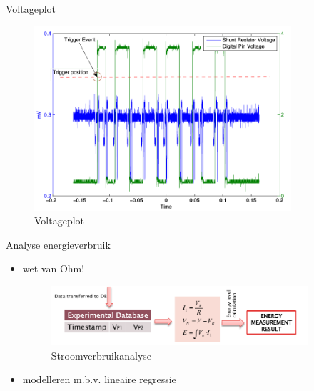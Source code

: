 \documentclass[presentation, bigger]{beamer}
\begin{document}
\begin{frame}[label=sec-3-4]{Voltageplot}
  \begin{figure}
    \centering
    \includegraphics[width=0.85\textwidth,keepaspectration=true]{elek/energy_measurement_plot.png}
    \caption{Voltageplot}
  \end{figure}
\end{frame}

\begin{frame}[label=sec-3-5]{Analyse energieverbruik}
  \begin{itemize}
  \item wet van Ohm!
    \begin{figure}
      \centering
      \includegraphics[width=0.9\textwidth,keepaspectration=true]{elek/diag2}

      \caption{Stroomverbruikanalyse}
    \end{figure}
  \item modelleren m.b.v. lineaire regressie
  \end{itemize}
\end{frame}
\end{document}

